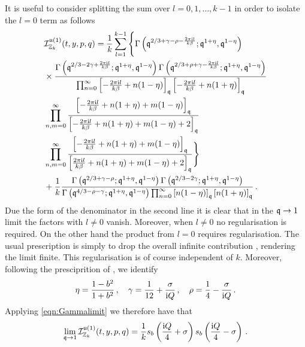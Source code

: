 \documentclass[main.tex]{subfiles}
\begin{document}
It is useful to consider splitting the sum over $l=0,1,\dots,k-1$ in order
to isolate the $l=0$ term as follows
\begin{equation}
\begin{aligned}
&\mathcal{I}^{\mathfrak{u}(1)}_{\mathbb{Z}_k}(t,y,p,q)=\frac{1}{k}\sum_{l=1}^{k-1}\Bigg\{\Gamma\left(\mathfrak{q}^{2/3+\gamma-\rho-\frac{2\pi\mathrm{i} l}{k\beta}};\mathfrak{q}^{1+\eta},\mathfrak{q}^{1-\eta}\right)\\
&\times\frac{\Gamma\left(\mathfrak{q}^{2/3-2\gamma+\frac{2\pi\mathrm{i} l}{k\beta}};\mathfrak{q}^{1+\eta},\mathfrak{q}^{1-\eta}\right)\Gamma\left(\mathfrak{q}^{2/3+\rho+\gamma-\frac{2\pi\mathrm{i} l}{k\beta}};\mathfrak{q}^{1+\eta},\mathfrak{q}^{1-\eta}\right)}{\prod_{n=0}^{\infty}\left[-\frac{2\pi\mathrm{i} l}{k\beta}+n(1-\eta)\right]_{\mathfrak{q}}\left[-\frac{2\pi\mathrm{i} l}{k\beta}+n(1+\eta)\right]_{\mathfrak{q}}}\\
&\prod_{n,m=0}^{\infty}\frac{\left[-\frac{2\pi\mathrm{i} l}{k\beta}+n(1+\eta)+m(1-\eta)\right]_{\mathfrak{q}}}{\left[-\frac{2\pi\mathrm{i} l}{k\beta}+n(1+\eta)+m(1-\eta)+2\right]_{\mathfrak{q}}}\\
&\prod_{n,m=0}^{\infty}\frac{\left[-\frac{2\pi\mathrm{i} l}{k\beta}+n(1+\eta)+m(1-\eta)\right]_{\mathfrak{q}}}{\left[\frac{2\pi\mathrm{i} l}{k\beta}+n(1+\eta)+m(1-\eta)+2\right]_{\mathfrak{q}}}\Bigg\}\\
&+\frac{1}{k}\frac{\Gamma\left(\mathfrak{q}^{2/3+\gamma-\rho};\mathfrak{q}^{1+\eta},\mathfrak{q}^{1-\eta}\right)\Gamma\left(\mathfrak{q}^{2/3-2\gamma};\mathfrak{q}^{1+\eta},\mathfrak{q}^{1-\eta}\right)}{\Gamma\left(\mathfrak{q}^{4/3-\rho-\gamma};\mathfrak{q}^{1+\eta},\mathfrak{q}^{1-\eta}\right)\prod_{n=0}^{\infty}\left[n(1-\eta)\right]_{\mathfrak{q}}\left[n(1+\eta)\right]_{\mathfrak{q}}}\,.
\end{aligned}
\end{equation}
Due the form of the denominator in the second line it is clear that in the $\mathfrak{q}\to1$ limit the factors with $l\neq0$ vanish. Moreover, when $l\neq0$ no regularisation is required. On the other hand the product from $l=0$ requires regularisation. The usual prescription is simply to drop the overall infinite contribution \cite{Gadde:2011ia}, rendering the limit finite. This regularisation is of course independent of $k$. Moreover, following the presciprition of \cite{Gadde:2011ia}, we identify
\begin{equation}
\eta=\frac{1-b^2}{1+b^2}\,,\quad \gamma=\frac{1}{12}+\frac{\sigma}{\mathrm{i} Q}\,,\quad\rho=\frac{1}{4}-\frac{\sigma}{\mathrm{i} Q}\,.
\end{equation} 
Applying \eqref{eqn:Gammalimit} we therefore have that
\begin{equation}
\lim_{\mathfrak{q}\to1}\mathcal{I}^{\mathfrak{u}(1)}_{\mathbb{Z}_k}(t,y,p,q)=\frac{1}{k}s_b\left(\frac{\mathrm{i} Q}{4}+\sigma\right)s_b\left(\frac{\mathrm{i} Q}{4}-\sigma\right)\,.
\end{equation}
\end{document}
